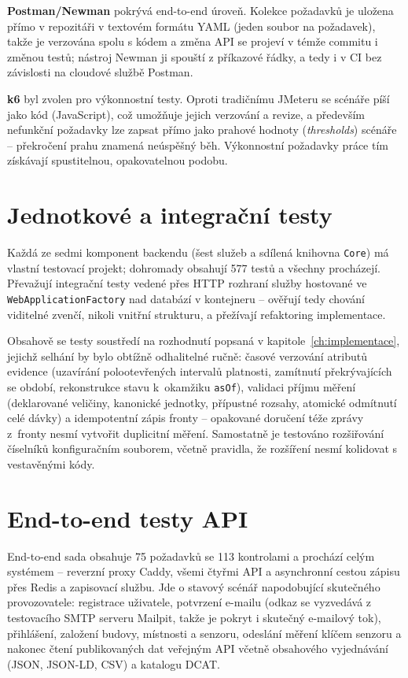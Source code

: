 \textbf{Postman/Newman} \parencite{PostmanWorldsLeading, PostmanlabsNewman2026} pokrývá end-to-end úroveň. Kolekce požadavků je uložena přímo v repozitáři v textovém formátu YAML (jeden soubor na požadavek), takže je verzována spolu s kódem a změna API se projeví v témže commitu i změnou testů; nástroj Newman ji spouští z příkazové řádky, a tedy i v CI bez závislosti na cloudové službě Postman.

\textbf{k6} \parencite{LoadTestingEngineering} byl zvolen pro výkonnostní testy. Oproti tradičnímu JMeteru se scénáře píší jako kód (JavaScript), což umožňuje jejich verzování a revize, a především nefunkční požadavky lze zapsat přímo jako prahové hodnoty (\emph{thresholds}) scénáře -- překročení prahu znamená neúspěšný běh. Výkonnostní požadavky práce tím získávají spustitelnou, opakovatelnou podobu.

\section{Jednotkové a integrační testy}

Každá ze sedmi komponent backendu (šest služeb a sdílená knihovna \texttt{Core}) má vlastní testovací projekt; dohromady obsahují 577 testů a všechny procházejí. Převažují integrační testy vedené přes HTTP rozhraní služby hostované ve \texttt{WebApplicationFactory} nad databází v kontejneru -- ověřují tedy chování viditelné zvenčí, nikoli vnitřní strukturu, a přežívají refaktoring implementace.

Obsahově se testy soustředí na rozhodnutí popsaná v kapitole~\ref{ch:implementace}, jejichž selhání by bylo obtížně odhalitelné ručně: časové verzování atributů evidence (uzavírání polootevřených intervalů platnosti, zamítnutí překrývajících se období, rekonstrukce stavu k~okamžiku \texttt{asOf}), validaci příjmu měření (deklarované veličiny, kanonické jednotky, přípustné rozsahy, atomické odmítnutí celé dávky) a idempotentní zápis fronty -- opakované doručení téže zprávy z~fronty nesmí vytvořit duplicitní měření. Samostatně je testováno rozšiřování číselníků konfiguračním souborem, včetně pravidla, že rozšíření nesmí kolidovat s vestavěnými kódy.

\section{End-to-end testy API}

End-to-end sada obsahuje 75 požadavků se 113 kontrolami a prochází celým systémem -- reverzní proxy Caddy, všemi čtyřmi API a asynchronní cestou zápisu přes Redis a zapisovací službu. Jde o stavový scénář napodobující skutečného provozovatele: registrace uživatele, potvrzení e-mailu (odkaz se vyzvedává z testovacího SMTP serveru Mailpit, takže je pokryt i skutečný e-mailový tok), přihlášení, založení budovy, místnosti a senzoru, odeslání měření klíčem senzoru a nakonec čtení publikovaných dat veřejným API včetně obsahového vyjednávání (JSON, JSON-LD, CSV) a katalogu DCAT.

